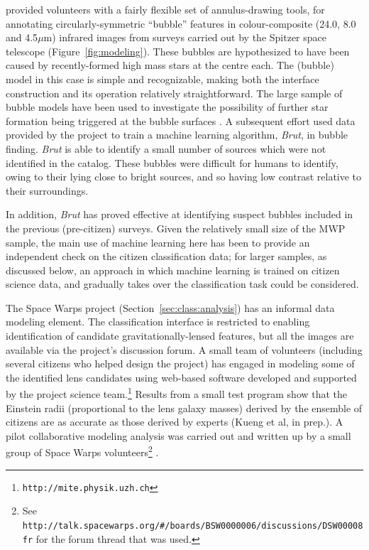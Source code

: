 \documentclass{ar2e}
\def\Sref#1{Section~\ref{#1}\xspace}
\def\Fref#1{Figure~\ref{#1}\xspace}
\def\CaseStudy#1{\noindent{\it\bf #1 \,\,\,\,}}
\def\url#1{\texttt{#1}}
\begin{document}
\CaseStudy{The Milky Way Project (MWP).}
\citet{Simpson++2012MWP} provided volunteers with a fairly flexible set of
annulus-drawing tools, for annotating circularly-symmetric ``bubble'' features
in colour-composite (24.0, 8.0 and  4.5$\mu$m) infrared images from surveys
carried out by the Spitzer space telescope (\Fref{fig:modeling}). 
These bubbles are hypothesized  to
have been caused by recently-formed high mass stars at the centre each. The
(bubble) model in this case is simple and recognizable, making both the
interface construction and its operation relatively straightforward. The large
sample of  bubble models have been used to investigate the possibility of
further star formation being triggered at the bubble surfaces
\citep{KendrewEtal2012}. A subsequent effort \citep{Beaumont} used data provided
by the project to train a machine learning algorithm, \textit{Brut}, in bubble
finding. \textit{Brut} is able to identify a small number of sources  which were
not identified in the \citeauthor{Simpson++2012MWP} catalog. These bubbles were
difficult for humans to identify,  owing to their lying close to bright sources,
and so having low contrast relative to their surroundings.

In addition, \textit{Brut} has proved effective at identifying suspect bubbles
included in the previous (pre-citizen) surveys. Given the relatively small size
of the MWP sample, the main use of machine learning here has been to provide an
independent check on the citizen classification data; for larger samples, as
discussed below, an approach in which machine learning is trained on citizen
science data, and gradually takes over the classification task could be
considered. 


\CaseStudy{Modelling Lens Candidates} 
The Space Warps project (\Sref{sec:class:analysis}) has an informal data
modeling element. The classification interface is restricted to enabling
identification of candidate gravitationally-lensed features, but all the images
are available via the project's discussion forum. A small team of volunteers
(including several citizens who helped design the project) has engaged in
modeling some of the identified lens candidates using web-based software
developed and supported by the project science
team.\footnote{\url{http://mite.physik.uzh.ch}} Results from a small test
program show that the Einstein radii (proportional to the lens galaxy masses) 
derived by the  ensemble of citizens are
as accurate as those derived by experts 
(Kueng et al, in prep.).
A pilot collaborative modeling analysis was carried out and written up by a
small group of Space Warps volunteers\footnote{See
\url{http://talk.spacewarps.org/\#/boards/BSW0000006/discussions/DSW00008fr} for
the forum thread that was used.} \citep{Wilcox2014}.
\end{document}
